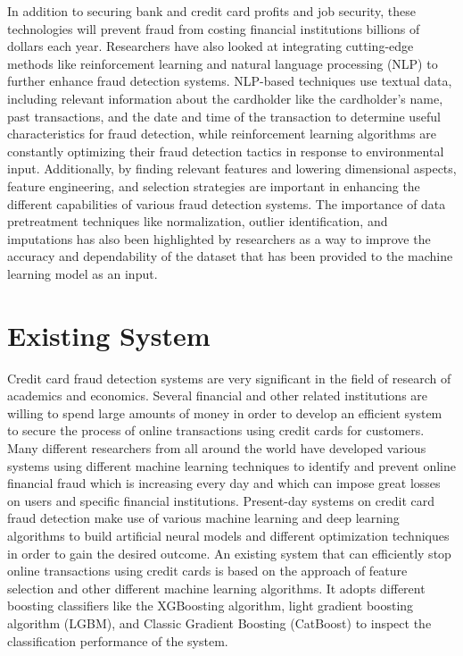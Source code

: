 In addition to securing bank and credit card profits and job security, these technologies will prevent fraud from costing financial institutions billions of dollars each year. Researchers have
also looked at integrating cutting-edge methods like reinforcement learning and natural
language processing (NLP) to further enhance fraud detection systems. NLP-based techniques
use textual data, including relevant information about the cardholder like the cardholder’s name,
past transactions, and the date and time of the transaction to determine useful characteristics
for fraud detection, while reinforcement learning algorithms are constantly optimizing their fraud
detection tactics in response to environmental input. Additionally, by finding relevant features
and lowering dimensional aspects, feature engineering, and selection strategies are important in
enhancing the different capabilities of various fraud detection systems. The importance of data pretreatment techniques like normalization, outlier identification, and imputations has also been
highlighted by researchers as a way to improve the accuracy and dependability of the dataset that has been provided to the machine learning model as an input.

\section{Existing System}

Credit card fraud detection systems are very significant in the field of research of academics
and economics. Several financial and other related institutions are willing to spend large
amounts of money in order to develop an efficient system to secure the process of online
transactions using credit cards for customers. Many different researchers from all around the
world have developed various systems using different machine learning techniques to identify
and prevent online financial fraud which is increasing every day and which can impose great
losses on users and specific financial institutions. Present-day systems on credit card fraud
detection make use of various machine learning and deep learning algorithms to build artificial
neural models and different optimization techniques in order to gain the desired outcome. An
existing system \citep{Priscilla-2020} that can efficiently stop online transactions using credit cards is based on the
approach of feature selection and other different machine learning algorithms. It adopts different
boosting classifiers like the XGBoosting algorithm, light gradient boosting algorithm (LGBM),
and Classic Gradient Boosting (CatBoost) to inspect the classification performance of the
system.

